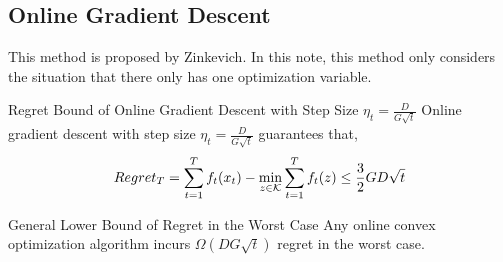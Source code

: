 		\subsection{Online Gradient Descent}
			This method is proposed by Zinkevich. In this note, this method only considers the situation that there only has one optimization variable.
			
			\begin{them}{Regret Bound of Online Gradient Descent with Step Size $\eta_t = \frac{D}{G\sqrt{t}}$}{} \label{thm:Regret Bound of Online Gradient Descent}
				Online gradient descent with step size $\eta_t = \frac{D}{G\sqrt{t}}$ guarantees that,
				$$
				Regret_T = \sum_{t=1}^T f_t(x_t) - \min_{z\in\mathcal{K}} \sum_{t=1}^T f_t(z) \le\frac{3}{2}GD\sqrt{t}
				$$
			\end{them}
		
			\begin{them}{General Lower Bound of Regret in the Worst Case}{}
				Any online convex optimization algorithm incurs $\Omega(DG\sqrt{t})$ regret in the worst case.
			\end{them}
		
